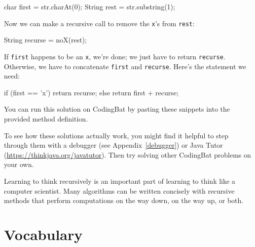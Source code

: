 \begin{code}
char first = str.charAt(0);
String rest = str.substring(1);
\end{code}

Now we can make a recursive call to remove the {\tt x}'s from {\tt rest}:

\begin{code}
String recurse = noX(rest);
\end{code}

If {\tt first} happens to be an {\tt x}, we're done; we just have to return {\tt recurse}.
Otherwise, we have to concatenate {\tt first} and {\tt recurse}.
Here's the  statement we need:

\begin{code}
if (first == 'x') {
    return recurse;
} else {
    return first + recurse;
}
\end{code}

You can run this solution on CodingBat by pasting these snippets into the provided method definition.



To see how these solutions actually work, you might find it helpful to step through them with a debugger (see Appendix~\ref{debugger}) or Java Tutor (\url{https://thinkjava.org/javatutor}).
Then try solving other CodingBat problems on your own.

Learning to think recursively is an important part of learning to think like a computer scientist.
Many algorithms can be written concisely with recursive methods that perform computations on the way down, on the way up, or both.


\section{Vocabulary}

